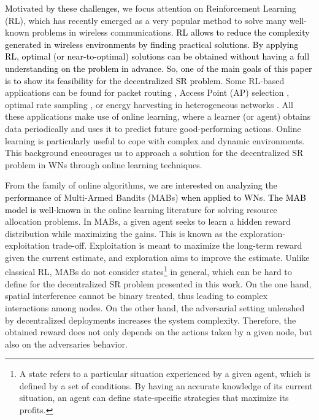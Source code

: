 \documentclass{article}
\begin{document}
	\textcolor{black}{Motivated by these challenges,} we focus attention on Reinforcement Learning (RL), which has recently emerged as a very popular method to solve many well-known problems in wireless communications. \textcolor{black}{RL allows to reduce the complexity generated in wireless environments by finding practical solutions. By applying RL, optimal (or near-to-optimal) solutions can be obtained without having a full understanding on the problem in advance. So, one of the main goals of this paper is to show its feasibility for the decentralized SR problem.} Some RL-based applications can be found for packet routing \cite{littman1993distributed}, Access Point (AP) selection \cite{bojovic2011supervised, bojovic2012neural}, optimal rate sampling \cite{combes2014optimal}, or energy harvesting in heterogeneous networks \cite{miozzo2015distributed}. All these applications make use of online learning, where a learner (or agent) obtains data periodically and uses it to predict future good-performing actions. Online learning is particularly useful to cope with complex and dynamic environments. This background encourages us to approach a solution for the decentralized SR problem in WNs through online learning techniques.
	
	From the family of online algorithms, we \textcolor{black}{are interested on analyzing the performance of} Multi-Armed Bandits (MABs) \cite{BCB12} \textcolor{black}{when applied to WNs. The MAB model is well-known} in the online learning literature for solving resource allocation problems. In MABs, a given agent seeks to learn a hidden reward distribution while maximizing the gains. This is known as the exploration-exploitation trade-off. Exploitation is meant to maximize the long-term reward given the current estimate, and exploration aims to improve the estimate. Unlike classical RL, MABs do not consider states\footnote{A state refers to a particular situation experienced by a given agent, which is defined by a set of conditions. By having an accurate knowledge of its current situation, an agent can define state-specific strategies that maximize its profits.} in general, which can be hard to define for the decentralized SR problem presented in this work. On the one hand, spatial interference cannot be binary treated, thus leading to complex interactions among nodes. On the other hand, the adversarial setting unleashed by decentralized deployments increases the system complexity. Therefore, the obtained reward does not only depends on the actions taken by a given node, but also on the adversaries behavior.
	
\end{document}
